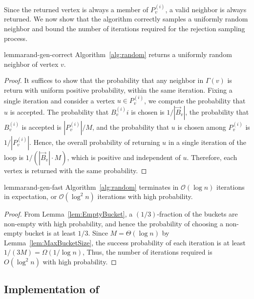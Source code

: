 Since the returned vertex is always a member of $P_v^{(i)}$, a valid neighbor is always returned.
We now show that the algorithm correctly samples a uniformly random neighbor
and bound the number of iterations required for the rejection sampling process.
\begin{restatable}{lemma}{rand-gen-correct}
\label{lem:rand_gen_correct}
Algorithm~\ref{alg:random} returns a uniformly random neighbor of vertex $v$.
\end{restatable}
\begin{proof}
It suffices to show that the probability that any neighbor in $\Gamma(v)$ is return with uniform positive probability, within the same iteration.
Fixing a single iteration and consider a vertex $u\in P_v^{(i)}$, we compute the probability that $u$ is accepted.
The probability that $B^{(i)}_vi$ is chosen is $1/|\vec B_v|$, the probability that $B^{(i)}_v$ is accepted is $|P_v^{(i)}|/M$,
and the probability that $u$ is chosen among $P_v^{(i)}$ is $1/|P_v^{(i)}|$.
Hence, the overall probability of returning $u$ in a single iteration
of the loop is $1/(|\vec B_v|\cdot M)$, which is positive and independent of $u$.
Therefore, each vertex is returned with the same probability.
\end{proof}

\begin{restatable}{lemma}{rand-gen-fast}
\label{lem:rand_gen_fast}
Algorithm~\ref{alg:random} terminates in $\mathcal{O}(\log n)$ iterations in expectation, or $\mathcal{O}(\log^2 n)$ iterations with high probability.
\end{restatable}
\begin{proof}
From Lemma~\ref{lem:EmptyBucket}, a $(1/3)$-fraction of the buckets are non-empty with high probability,
and hence the probability of choosing a non-empty bucket is at least $1/3$.
Since $M = \Theta(\log n)$ by Lemma~\ref{lem:MaxBucketSize}, the success probability of each iteration is at least $1/(3M)=\Omega(1/\log n)$,
Thus, the number of iterations required is $O(\log^2 n)$ with high probability.
\end{proof}





\subsection{Implementation of }
\label{sec:fill_implement}

